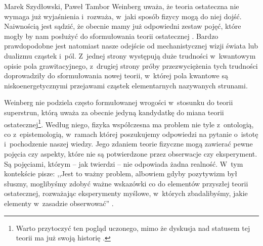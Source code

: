 \begin{artplenv2auth}{Marek Szydłowski, Paweł Tambor}
Weinberg uważa, że teoria ostateczna nie wymaga już wyjaśnienia i~rozważa, w~jaki sposób fizycy mogą do niej dojść. Naiwnością jest sądzić, że obecnie mamy już odpowiedni zestaw pojęć, które mogły by nam posłużyć do sformułowania teorii ostatecznej
\parencite[][s.~139]{weinberg_sen_1992}. %
 Bardzo prawdopodobne jest natomiast nasze odejście od mechanistycznej wizji świata lub dualizmu cząstek i~pól. Z~jednej strony występują duże trudności w~kwantowym opisie pola grawitacyjnego, z~drugiej strony próby przezwyciężenia tych trudności doprowadziły do sformułowania nowej teorii, w~której pola kwantowe są niskoenergetycznymi przejawami cząstek elementarnych nazywanych strunami.

Weinberg nie podziela często formułowanej wrogości w~stosunku do teorii superstrun, którą uważa za obecnie jedyną kandydatkę do miana teorii ostatecznej\footnote{ Warto przytoczyć ten pogląd uczonego, mimo że dyskusja nad statusem tej teorii ma już swoją historię
\parencite[por.][s.~174]{weinberg_sen_1992}.%
 }. Według niego, fizyka współczesna ma problem nie tyle z~ontologią, co z~epistemologią, w~ramach której poszukujemy odpowiedzi na pytanie o~istotę i~pochodzenie naszej wiedzy. Jego zdaniem teorie fizyczne mogą zawierać pewne pojęcia czy aspekty, które nie są potwierdzone przez obserwacje czy eksperyment. Są pojęciami, którym -- jak twierdzi -- nie odpowiada żadna realność. W~tym kontekście pisze: ,,Jest to ważny problem, albowiem gdyby pozytywizm był słuszny, moglibyśmy zdobyć ważne wskazówki co do elementów przyszłej teorii ostatecznej, rozważając eksperymenty myślowe, w~których zbadalibyśmy, jakie elementy w~zasadzie obserwować'' 
\parencite[][s.~141]{weinberg_sen_1992}.%



\end{artplenv2auth}
